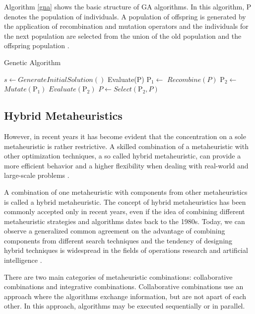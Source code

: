 Algorithm \ref{gna} shows the basic structure of GA algorithms. In this algorithm, P denotes the population of individuals. A population of offspring is generated by the application of recombination and mutation operators and the individuals for the next population are selected from the union of the old population and the offspring population \citep{raidl2010metaheuristic}.


\begin{algorithm}[h]
  \caption{Genetic Algorithm}\label{gna}
  \begin{algorithmic}[3]
    
    \State $s\gets GenerateInitialSolution()$
    \State Evaluate(P)
    \State $\mbox{P}_1\gets$ $Recombine(P)$
    \State $\mbox{P}_2\gets$ $Mutate(\mbox{P}_1)$ 
    \State $Evaluate(\mbox{P}_2)$
    \State $P\gets Select(\mbox{P}_2,P)$
    \EndWhile
      
  \end{algorithmic}
\end{algorithm}

\subsection{Hybrid  Metaheuristics}

However, in recent years it has become evident that the concentration on a sole metaheuristic is rather restrictive. A skilled combination of a metaheuristic with other optimization techniques, a so called hybrid metaheuristic, can provide a more efficient behavior
and a higher flexibility when dealing with real-world and large-scale problems \citep{Talbi2012}.

A combination of one metaheuristic with components from other metaheuristics is called a hybrid metaheuristic. The concept of hybrid metaheuristics has been commonly accepted only in recent years, even if the idea of combining different metaheuristic strategies and algorithms dates back to the 1980s. Today, we can observe a generalized common agreement on the advantage of combining components from different search techniques and the tendency of designing hybrid techniques is widespread in the fields of operations research and artificial intelligence \citep{raidl2010metaheuristic}. 

There are two main categories of metaheuristic combinations: collaborative combinations and integrative combinations. Collaborative combinations use an approach where the algorithms exchange information, but are not apart of each other. In this approach, algorithms may be executed sequentially or in parallel. 

